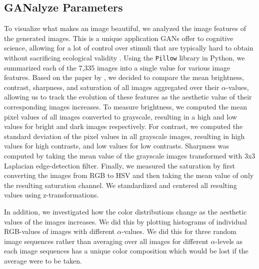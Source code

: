 \documentclass[../main.tex]{subfiles}
\begin{document}
	
	
\subsection{GANalyze Parameters}
To visualize what makes an image beautiful, we analyzed the image features of the generated images. This is a unique application GANs offer to cognitive science, allowing for a lot of control over stimuli that are typically hard to obtain without sacrificing ecological validity \parencite{goetschalckx2021generative}. Using the \texttt{Pillow} library \parencite{clark2015pillow} in Python, we summarized each of the 7,335 images into a single value for various image features. Based on the paper by \textcite{ke2006design}, we decided to compare the mean brightness, contrast, sharpness, and saturation of all images aggregated over their $\alpha$-values, allowing us to track the evolution of these features as the aesthetic value of their corresponding images increases. To measure brightness, we computed the mean pixel values of all images converted to grayscale, resulting in a high and low values for bright and dark images respectively. For contrast, we computed the standard deviation of the pixel values in all grayscale images, resulting in high values for high contrasts, and low values for low contrasts. Sharpness was computed by taking the mean value of the grayscale images transformed with 3x3 Laplacian edge-detection filter. Finally, we measured the saturation by first converting the images from RGB to HSV and then taking the mean value of only the resulting saturation channel. We standardized and centered all resulting values using z-transformations.
	
In addition, we investigated how the color distributions change as the aesthetic values of the images increases. We did this by plotting histograms of individual RGB-values of images with different $\alpha$-values. We did this for three random image sequences rather than averaging over all images for different $\alpha$-levels as each image sequences has a unique color composition which would be lost if the average were to be taken.
\end{document}
